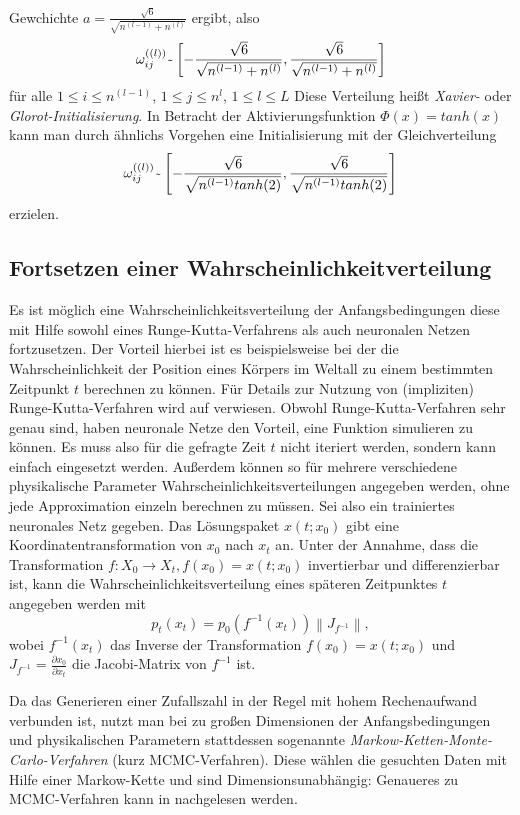 Gewchichte $a=\frac{\sqrt {6}}{\sqrt {n^{(l-1)} + n^{(l)}}}$ ergibt, also
\[
    \omega_{ij}^{((l))} \raisebox{-0.9ex}{\~{}}
    \left[ -\frac{\sqrt {6}}{\sqrt {n^{(l-1)} + n^{(l)}}}, \frac{\sqrt {6}}{\sqrt {n^{(l-1)} + n^{(l)}}} \right]
\]
für alle $1\leq i \leq n^{(l-1)}$, $1\leq j \leq n^{l}$, $1\leq l \leq L$ Diese Verteilung heißt \textit{Xavier-} oder
\textit{Glorot-Initialisierung}. In Betracht der Aktivierungsfunktion $\Phi(x)=tanh(x)$ kann man durch ähnlichs Vorgehen
eine Initialisierung mit der Gleichverteilung
\[
    \omega_{ij}^{((l))} \raisebox{-0.9ex}{\~{}}
    \left[ -\frac{\sqrt {6}}{\sqrt {n^{(l-1)} tanh(2)}}, \frac{\sqrt {6}}{\sqrt {n^{(l-1)} tanh(2)}} \right]
\]
erzielen.

\subsection{Fortsetzen einer Wahrscheinlichkeitverteilung}
\label{subsec:fortsetzeneinerwahrscheinlichkeitsverteilung}
Es ist möglich eine Wahrscheinlichkeitsverteilung der Anfangsbedingungen diese mit Hilfe sowohl eines
Runge-Kutta-Verfahrens als auch neuronalen Netzen fortzusetzen. Der Vorteil hierbei ist es beispielsweise bei der
die Wahrscheinlichkeit der Position eines Körpers im Weltall zu einem bestimmten Zeitpunkt $t$ berechnen zu können. Für
Details zur Nutzung von (impliziten) Runge-Kutta-Verfahren wird auf \cite{aristoffIMPLICITRUNGEKUTTAMETHODS} verwiesen.
Obwohl Runge-Kutta-Verfahren sehr genau sind, haben neuronale Netze den Vorteil, eine Funktion simulieren zu können.
Es muss also für die gefragte Zeit $t$ nicht iteriert werden, sondern kann einfach eingesetzt werden. Außerdem können
so für mehrere verschiedene physikalische Parameter Wahrscheinlichkeitsverteilungen angegeben werden, ohne jede
Approximation einzeln berechnen zu müssen. Sei also ein trainiertes neuronales Netz gegeben. Das Lösungspaket
$x(t; x_0)$ gibt eine Koordinatentransformation von $x_0$ nach $x_t$ an. Unter der Annahme, dass die Transformation
$f: X_0 \rightarrow X_t, f(x_0) = x(t;x_0)$ invertierbar und differenzierbar ist, kann die Wahrscheinlichkeitsverteilung
eines späteren Zeitpunktes $t$ angegeben werden mit
\[
    p_t(x_t) = p_0(f^{-1}(x_t)) \left\lVert J_{f^{-1}} \right\rVert,
\]
wobei $f^{-1}(x_t)$ das Inverse der Transformation $f(x_0)=x(t;x_0)$ und $J_{f^{-1}}= \frac{\partial x_0}{\partial x_t}$
die Jacobi-Matrix von $f^{-1}$ ist.

Da das Generieren einer Zufallszahl in der Regel mit hohem Rechenaufwand verbunden ist, nutzt man bei zu großen
Dimensionen der Anfangsbedingungen und physikalischen Parametern stattdessen sogenannte
\textit{Markow-Ketten-Monte-Carlo-Verfahren} (kurz MCMC-Verfahren). Diese wählen die gesuchten Daten mit Hilfe einer
Markow-Kette und sind Dimensionsunabhängig: Genaueres zu MCMC-Verfahren kann in \cite{SamplingMethods}nachgelesen
werden.
